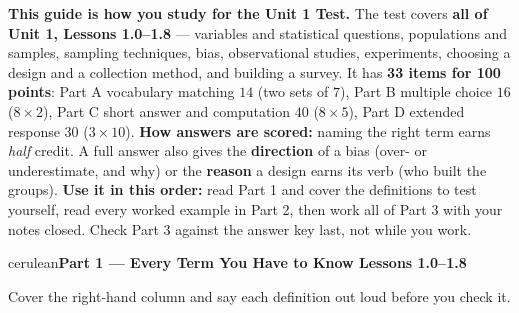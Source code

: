\documentclass[10pt]{article}
\newcommand{\parthead}[1]{%
  \vspace{6pt}\noindent
  \begin{headlinebox}{cerulean}{\color{white}\bfseries #1}\end{headlinebox}%
  \vspace{4pt}}
\begin{document}
\namedateperiod

\vspace{0.10in}
\begin{remindbox}
\small
\textbf{This guide is how you study for the Unit 1 Test.} The test covers
\textbf{all of Unit 1, Lessons 1.0--1.8} --- variables and statistical questions, populations
and samples, sampling techniques, bias, observational studies, experiments, choosing a design
and a collection method, and building a survey. It has \textbf{33 items for 100 points}:
Part A vocabulary matching $14$ (two sets of $7$), Part B multiple choice $16$ ($8 \times 2$),
Part C short answer and computation $40$ ($8 \times 5$), Part D extended response $30$
($3 \times 10$).
\textbf{How answers are scored:} naming the right term earns \emph{half} credit. A full answer
also gives the \textbf{direction} of a bias (over- or underestimate, and why) or the
\textbf{reason} a design earns its verb (who built the groups).
\textbf{Use it in this order:} read Part 1 and cover the definitions to test yourself, read
every worked example in Part 2, then work all of Part 3 with your notes closed. Check Part 3
against the answer key last, not while you work.
\end{remindbox}

\parthead{Part 1 --- Every Term You Have to Know \hfill Lessons 1.0--1.8}

\small
Cover the right-hand column and say each definition out loud before you check it.
\end{document}
